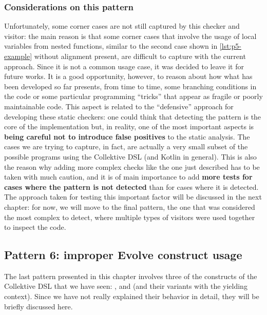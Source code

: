 \documentclass[12pt,a4paper,openright,twoside]{book}
\begin{document}
\subsubsection{Considerations on this pattern}

Unfortunately, some corner cases are not still captured by this checker and
visitor: the main reason is that some corner cases that involve the usage of
local variables from nested functions, similar to the second case shown in
\cref{lst:p5-example} without alignment present, are difficult to capture with
the current approach. Since it is not a common usage case, it was decided to
leave it for future works. It is a good opportunity, however, to reason about
how what has been developed so far presents, from time to time, some
branching conditions in the code or some particular programming ``tricks'' that
appear as fragile or poorly maintainable code. 
%
This aspect is related to the ``defensive'' approach for developing these static
checkers: one could think that detecting the pattern is the core of the
implementation but, in reality, one of the most important aspects is
\textbf{being careful not to introduce false
positives} \cite{DBLP:journals/jss/LenarduzziPSLP23} to the static analysis.
%
The cases we are trying to capture, in fact, are actually a very small subset of
the possible programs using the Collektive \ac{DSL} (and Kotlin in general).
This is also the reason why adding more complex checks like the one just
described has to be taken with much caution, and it is of main importance to add
\textbf{more tests for cases where the pattern is not detected} than for cases
where it is detected.
%
The approach taken for testing this important factor will be discussed in the
next chapter: for now, we will move to the final pattern, the one that was
considered the most complex to detect, where multiple types of visitors were
used together to inspect the code.


 
\subsection{Pattern 6: improper Evolve construct usage}

The last pattern presented in this chapter involves three of the constructs of
the Collektive \ac{DSL} that we have seen: ,  and
 (and their variants with the yielding context). Since we have not
really explained their behavior in detail, they will be briefly discussed here.
\end{document}
